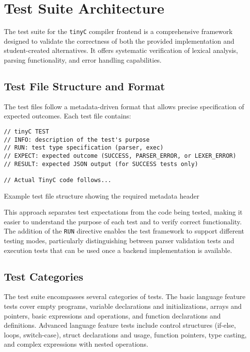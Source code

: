 






\section{Test Suite Architecture}
The test suite for the \texttt{tinyC} compiler frontend is a comprehensive framework designed to validate the correctness of both the provided implementation and student-created alternatives. It offers systematic verification of lexical analysis, parsing functionality, and error handling capabilities.

\subsection{Test File Structure and Format}
The test files follow a metadata-driven format that allows precise specification of expected outcomes. Each test file contains:

\begin{listing}[h!]
\begin{verbatim}
// tinyC TEST
// INFO: description of the test's purpose
// RUN: test type specification (parser, exec)
// EXPECT: expected outcome (SUCCESS, PARSER_ERROR, or LEXER_ERROR)
// RESULT: expected JSON output (for SUCCESS tests only)

// Actual TinyC code follows...
\end{verbatim}
\caption{Example test file structure showing the required metadata header}
\label{code:test-file-structure}
\end{listing}

This approach separates test expectations from the code being tested, making it easier to understand the purpose of each test and to verify correct functionality. The addition of the \texttt{RUN} directive enables the test framework to support different testing modes, particularly distinguishing between parser validation tests and execution tests that can be used once a backend implementation is available.

\subsection{Test Categories}
The test suite encompasses several categories of tests. The basic language feature tests cover empty programs, variable declarations and initializations, arrays and pointers, basic expressions and operations, and function declarations and definitions. Advanced language feature tests include control structures (if-else, loops, switch-case), struct declarations and usage, function pointers, type casting, and complex expressions with nested operations.

